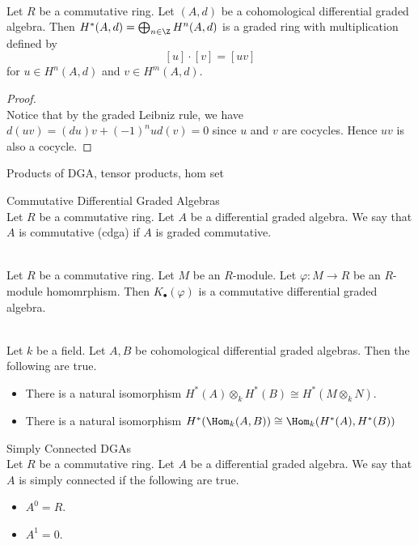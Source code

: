 \documentclass[a4paper]{article}
\begin{document}
\begin{lmm}{}{}\\
Let $R$ be a commutative ring. Let $(A,d)$ be a cohomological differential graded algebra. Then $H^\ast(A,d)=\bigoplus_{n\in\Z}H^n(A,d)$ is a graded ring with multiplication defined by $$[u]\cdot[v]=[uv]$$ for $u\in H^n(A,d)$ and $v\in H^m(A,d)$. 
\begin{proof}\\
Notice that by the graded Leibniz rule, we have $d(uv)=(du)v+(-1)^nud(v)=0$ since $u$ and $v$ are cocycles. Hence $uv$ is also a cocycle. 
\end{proof}
\end{lmm}

Products of DGA, tensor products, hom set

\begin{defn}{Commutative Differential Graded Algebras}{}\\
Let $R$ be a commutative ring. Let $A$ be a differential graded algebra. We say that $A$ is commutative (cdga) if $A$ is graded commutative. 
\end{defn}

\begin{lmm}{}{}\\
Let $R$ be a commutative ring. Let $M$ be an $R$-module. Let $\varphi:M\to R$ be an $R$-module homomrphism. Then $K_\bullet(\varphi)$ is a commutative differential graded algebra. 
\end{lmm}

\begin{prp}{}{}\\
Let $k$ be a field. Let $A,B$ be cohomological differential graded algebras. Then the following are true. 
\begin{itemize}
\item There is a natural isomorphism $H^\ast(A)\otimes_k H^\ast(B)\cong H^\ast(M\otimes_k N)$. 
\item There is a natural isomorphism $H^\ast(\Hom_k(A,B))\cong\Hom_k(H^\ast(A),H^\ast(B))$
\end{itemize}
\end{prp}

\begin{defn}{Simply Connected DGAs}{}\\
Let $R$ be a commutative ring. Let $A$ be a differential graded algebra. We say that $A$ is simply connected if the following are true. 
\begin{itemize}
\item $A^0=R$. 
\item $A^1=0$. 
\end{itemize}
\end{defn}
\end{document}
